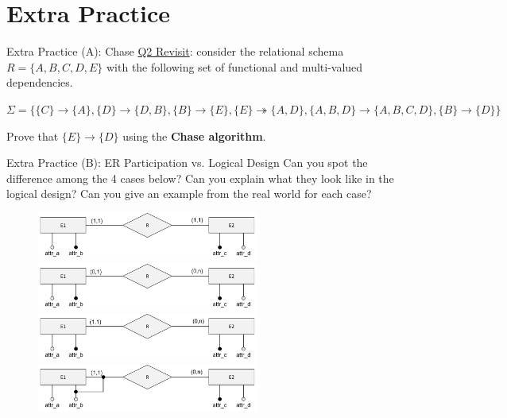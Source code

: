 \section*{Extra Practice}
\begin{frame}[fragile]{Extra Practice (A): Chase}
\underline{Q2 Revisit}: consider the relational schema $R = \{A,B,C,D,E\}$ with the following set of functional and multi-valued dependencies.\\ \vspace{5pt}

$\Sigma=\{\{C\}\rightarrow\{A\}, \{D\}\rightarrow\{D,B\}, \{B\}\rightarrow\{E\},\{E\}\twoheadrightarrow\{A,D\},\{A,B,D\}\rightarrow\{A,B,C,D\},\{B\}\rightarrow\{D\}\}$\\ \vspace{5pt}

Prove that $\{E\}\rightarrow\{D\}$ using the \textbf{Chase algorithm}.\\ \vspace{5pt}
\end{frame}

\begin{frame}[fragile]{Extra Practice (B): ER Participation vs. Logical Design}
Can you spot the difference among the 4 cases below? Can you explain what they look like in the logical design? Can you give an example from the real world for each case?\\ \vspace{4pt}
	
\begin{figure}
	\includegraphics[width=0.65\textwidth, trim=0 0 0 0, clip]{t4/images/case1.png}
	\includegraphics[width=0.65\textwidth, trim=0 0 0 0, clip]{t4/images/case2.png}
	\includegraphics[width=0.65\textwidth, trim=0 0 0 0, clip]{t4/images/case3.png}
	\includegraphics[width=0.65\textwidth, trim=0 0 0 0, clip]{t4/images/case4.png}
\end{figure}
\end{frame}

